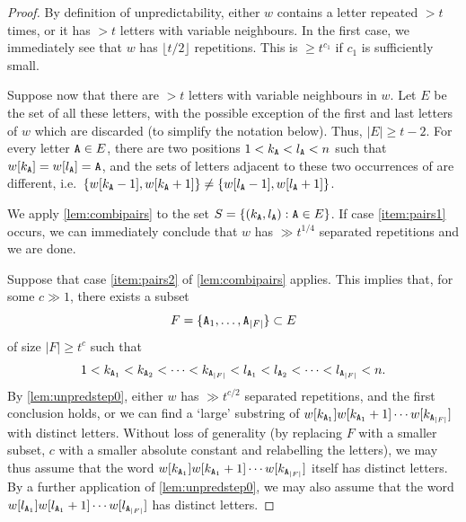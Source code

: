 \documentclass[11pt]{amsart}
\theoremstyle{definition}
\renewcommand{\geq}{\geqslant}
\newcommand{\abs}[1]{\left|#1\right|}
\newcommand{\upletters}[1]{{\normalfont{\texttt{#1}}}}
\newcommand{\makesubscript}[1]{\textsubscript{$#1$}}
\begin{document}
\begin{proof}
By definition of unpredictability, either $w$ contains a letter repeated $>t$ times, or it has $>t$ letters with variable neighbours. In the first case, we immediately see that $w$ has $\lfloor t/2 \rfloor$ repetitions. This is $\geq t^{c_1}$ if $c_1$ is sufficiently small.

Suppose now that there are $>t$ letters with variable neighbours in $w$. Let $E$ be the set of all these letters, with the possible exception of the first and last letters of $w$ which are discarded (to simplify the notation below). Thus, $\abs{E} \geq t-2$. For every letter $\upletters{A} \in E$, there are two positions $1<k_{\upletters{A}}<l_{\upletters{A}}<n$ such that $w[k_{\upletters{A}}] = w[l_{\upletters{A}}] = \upletters{A}$, and the sets of letters adjacent to these two occurrences of \upletters{A} are different, i.e.~$\{w[k_{\upletters{A}}-1], w[k_{\upletters{A}}+1]\} \neq \{w[l_{\upletters{A}}-1], w[l_{\upletters{A}}+1]\}$.

We apply \cref{lem:combipairs} to the set $S = \{(k_{\upletters{A}}, l_{\upletters{A}}) : \upletters{A}\in E\}$. If case \cref{item:pairs1} occurs, we can immediately conclude that $w$ has $\gg t^{1/4}$ separated repetitions and we are done.

Suppose that case \cref{item:pairs2} of \cref{lem:combipairs} applies. This implies that, for some $c\gg1$, there exists a subset 
\begin{equation*}
	F = \{\upletters{A\makesubscript{1}},\ldots,\upletters{A\makesubscript{\abs{F}}}\}\subset E
\end{equation*}
of size $\abs{F} \geq t^{c}$ such that 
\begin{equation*}
	1<k_{\upletters{A\makesubscript{1}}}<k_{\upletters{A\makesubscript{2}}}<\cdots <k_{\upletters{A\makesubscript{\abs{F}}}}<l_\upletters{A\makesubscript{1}}<l_\upletters{A\makesubscript{2}}<\cdots <l_{\upletters{A\makesubscript{\abs{F}}}}<n.
\end{equation*}
By \cref{lem:unpredstep0}, either $w$ has $\gg t^{c/2}$ separated repetitions, and the first conclusion holds, or we can find a `large' substring of $w[k_{\upletters{A\makesubscript{1}}}]w[k_{\upletters{A\makesubscript{1}}}+1]\cdots w[k_{\upletters{A\makesubscript{\abs{F}}}}]$ with distinct letters. Without loss of generality (by replacing $F$ with a smaller subset, $c$ with a smaller absolute constant and relabelling the letters), we may thus assume that the word $w[k_{\upletters{A\makesubscript{1}}}]w[k_{\upletters{A\makesubscript{1}}}+1]\cdots w[k_{\upletters{A\makesubscript{\abs{F}}}}]$ itself has distinct letters. By a further application of \cref{lem:unpredstep0}, we may also assume that the word $w[l_{\upletters{A\makesubscript{1}}}]w[l_{\upletters{A\makesubscript{1}}}+1]\cdots w[l_{\upletters{A\makesubscript{\abs{F}}}}]$ has distinct letters. 


\end{proof}
\end{document}
